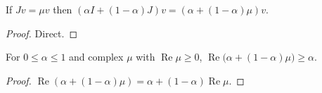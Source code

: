 \begin{lemma}\label{lem:T5-shrink-eig}
  \leanok
  If $Jv=\mu v$ then $(\alpha I+(1-\alpha)J)v=(\alpha+(1-\alpha)\mu)v$.
\end{lemma}

\begin{proof}
  \leanok
  Direct.
\end{proof}

\begin{lemma}\label{lem:T5-shrink-re}
  \leanok
  For $0\le\alpha\le1$ and complex $\mu$ with $\operatorname{Re}\mu\ge0$,
  $\operatorname{Re}\bigl(\alpha+(1-\alpha)\mu\bigr)\ge\alpha$.
\end{lemma}

\begin{proof}
  \leanok
  $\operatorname{Re}(\alpha+(1-\alpha)\mu)=\alpha+(1-\alpha)\operatorname{Re}\mu$.
\end{proof}
